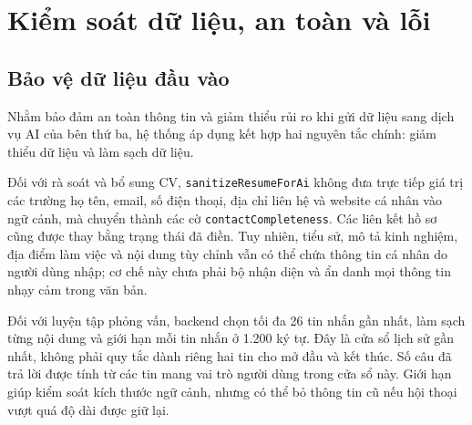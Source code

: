 

\section{Kiểm soát dữ liệu, an toàn và lỗi}




\subsection{Bảo vệ dữ liệu đầu vào}

Nhằm bảo đảm an toàn thông tin và giảm thiểu rủi ro khi gửi dữ liệu sang dịch vụ AI của bên thứ ba, hệ thống áp dụng kết hợp hai nguyên tắc chính: giảm thiểu dữ liệu và làm sạch dữ liệu.

Đối với rà soát và bổ sung CV, \texttt{sanitizeResumeForAi} không đưa trực tiếp giá trị các trường họ tên, email, số điện thoại, địa chỉ liên hệ và website cá nhân vào ngữ cảnh, mà chuyển thành các cờ \texttt{contactCompleteness}. Các liên kết hồ sơ cũng được thay bằng trạng thái đã điền. Tuy nhiên, tiểu sử, mô tả kinh nghiệm, địa điểm làm việc và nội dung tùy chỉnh vẫn có thể chứa thông tin cá nhân do người dùng nhập; cơ chế này chưa phải bộ nhận diện và ẩn danh mọi thông tin nhạy cảm trong văn bản.


Đối với luyện tập phỏng vấn, backend chọn tối đa 26 tin nhắn gần nhất, làm sạch từng nội dung và giới hạn mỗi tin nhắn ở 1.200 ký tự. Đây là cửa sổ lịch sử gần nhất, không phải quy tắc dành riêng hai tin cho mở đầu và kết thúc. Số câu đã trả lời được tính từ các tin mang vai trò người dùng trong cửa sổ này. Giới hạn giúp kiểm soát kích thước ngữ cảnh, nhưng có thể bỏ thông tin cũ nếu hội thoại vượt quá độ dài được giữ lại.

